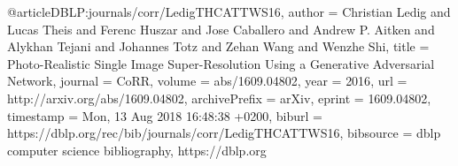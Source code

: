 @article{DBLP:journals/corr/LedigTHCATTWS16,
  author    = {Christian Ledig and
               Lucas Theis and
               Ferenc Huszar and
               Jose Caballero and
               Andrew P. Aitken and
               Alykhan Tejani and
               Johannes Totz and
               Zehan Wang and
               Wenzhe Shi},
  title     = {Photo-Realistic Single Image Super-Resolution Using a Generative Adversarial
               Network},
  journal   = {CoRR},
  volume    = {abs/1609.04802},
  year      = {2016},
  url       = {http://arxiv.org/abs/1609.04802},
  archivePrefix = {arXiv},
  eprint    = {1609.04802},
  timestamp = {Mon, 13 Aug 2018 16:48:38 +0200},
  biburl    = {https://dblp.org/rec/bib/journals/corr/LedigTHCATTWS16},
  bibsource = {dblp computer science bibliography, https://dblp.org}
}